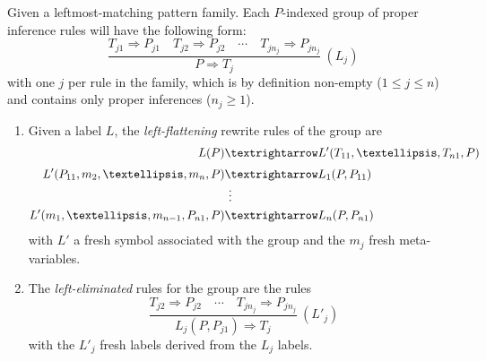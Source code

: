 \documentclass[letterpaper,11pt]{article}
\begin{document}

\begin{definition}
  Given a leftmost-matching pattern family. Each $P$-indexed group of proper inference rules will
  have the following form:
  \begin{displaymath}
    \dfrac{ T_{j1} ⇒ P_{j1} \quad T_{j2} ⇒ P_{j2} \quad\cdots\quad T_{jn_j} ⇒ P_{jn_j} }{ P ⇒ T_j } ~ (L_j)
  \end{displaymath}
  with one $j$ per rule in the family, which is by definition non-empty ($1≤j≤n$) and contains only
  proper inferences ($n_j≥1$).
  \begin{enumerate}

  \item Given a label $L$, the \emph{left-flattening} rewrite rules of the group are
    \begin{align*}
      L(P) &→ L'(T_{11}, …,T_{n1}, P) \\[\jot]
      L'(P_{11}, m_2, …, m_n, P) &→ L_1(P, P_{11}) \\[-\jot]
      &~\vdots\\
      L'(m_1, …, m_{n-1}, P_{n1}, P) &→ L_n(P, P_{n1})
    \end{align*}
    with $L'$ a fresh symbol associated with the group and the $m_j$ fresh meta-variables.

  \item The \emph{left-eliminated} rules for the group are the rules
    \begin{displaymath}
      \dfrac{ T_{j2} ⇒ P_{j2} \quad\cdots\quad T_{jn_j} ⇒ P_{jn_j} }{ L_j(P, P_{j1}) ⇒ T_j } ~ (L'_j)
    \end{displaymath}
    with the $L'_j$ fresh labels derived from the $L_j$ labels.

  \end{enumerate}
\end{definition}
\end{document}
